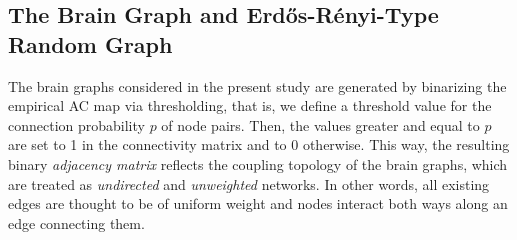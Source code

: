 \documentclass[fleqn,10pt]{wlpeerj}
\begin{document}
% 

\subsection*{The Brain Graph and Erd\H{o}s-R\'{e}nyi-Type Random Graph}

The brain graphs considered in the present study are generated by binarizing the empirical AC map via thresholding, that
is, we define a threshold value for
the connection probability $p$ of node pairs. Then, the values greater and equal to $p$ are set to 1 in the
connectivity matrix and to 0 otherwise. This way, the resulting binary \textit{adjacency matrix} reflects the coupling
topology of the brain graphs, which are treated as \textit{undirected} and \textit{unweighted} networks. In other words,
all existing edges are thought to be of uniform weight and nodes interact both ways along an edge connecting them. 
\end{document}
